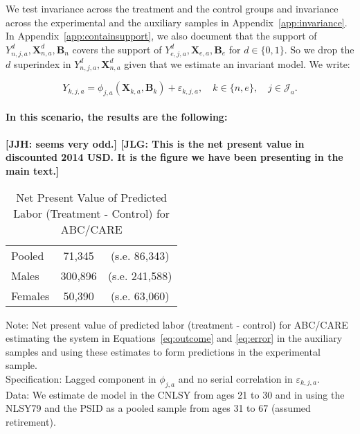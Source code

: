 \noindent We test invariance across the treatment and the control groups and invariance across the experimental and the auxiliary samples  in Appendix~\ref{app:invariance}.\\

\noindent In Appendix~\ref{app:containsupport}, we also document that the support of $Y_{n,j,a}^d, \bm{X}_{n,a}^d, \bm{B}_{n}$ covers the support of $Y_{e,j,a}^d, \bm{X}_{e,a}, \bm{B}_{e}$ for $d \in \{0, 1\}$. So we drop the $d$ superindex in $Y_{n,j,a}^d, \bm{X}_{n,a}^d$ given that we estimate an invariant model. We write:

\begin{equation}\label{eq:routcome}
Y_{k,j,a} = \phi_{j,a} (\bm{X}_{k,a}, \bm{B}_k) + \varepsilon_{k,j,a}, \quad k \in \{n,e\}, \quad j \in \mathcal{J}_a.
\end{equation}\\

\noindent \textbf{In this scenario, the results are the following:}\\ \\
\noindent \textbf{[JJH: seems very odd.] [JLG: This is the net present value in discounted 2014 USD. It is the figure we have been presenting in the main text.]}\\

\begin{table}[H] 
\begin{threeparttable}
\caption{Net Present Value of Predicted Labor (Treatment - Control) for ABC/CARE}
\label{table:yourlabel}
\centering 
\begin{tabular}{lcc} \toprule
Pooled & 71,345 & (s.e. 86,343) \\
Males & 300,896 & (s.e. 241,588) \\ 
Females & 50,390 & (s.e. 63,060) \\ \bottomrule
\end{tabular}
\end{threeparttable}
\end{table}
\begin{spacing}{1}
\begin{footnotesize}
\noindent Note: Net present value of predicted labor (treatment - control) for ABC/CARE estimating the system in Equations~\eqref{eq:outcome} and \eqref{eq:error} in the auxiliary samples and using these estimates to form predictions in the experimental sample.\\ 
\noindent Specification: Lagged component in $\phi_{j,a}$ and no serial correlation in $\varepsilon_{k,j,a}$.\\
\noindent Data: We estimate de model in the CNLSY from ages 21 to 30 and in using the NLSY79 and the PSID as a pooled sample from ages 31 to 67 (assumed retirement). 
\end{footnotesize}
\end{spacing}


